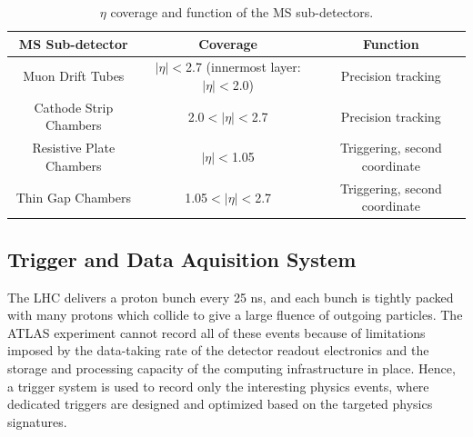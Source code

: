 \begin{table}[!ht]
    \small
    \centering
    \begin{tabular}{ccc}
        \hline \hline
        MS Sub-detector & Coverage & Function \\
        \hline
        Muon Drift Tubes        & $|\eta|<$2.7 (innermost layer: $|\eta|<$2.0) & Precision tracking \\
        Cathode Strip Chambers & 2.0$<|\eta|<$2.7 & Precision tracking \\
        Resistive Plate Chambers & $|\eta|<$1.05 & Triggering, second coordinate \\
        Thin Gap Chambers & 1.05$<|\eta|<$2.7 & Triggering, second coordinate \\
        \hline \hline
    \end{tabular}
    \caption{$\eta$ coverage and function of the MS sub-detectors.}
    \label{tab:ms_systems}
\end{table}

\subsection{Trigger and Data Aquisition System} \label{sub:trig}
The LHC delivers a proton bunch every 25 ns, and each bunch is tightly packed with many protons which collide to give a large fluence of outgoing particles. The ATLAS experiment cannot record all of these events because of limitations imposed by the data-taking rate of the detector readout electronics and the storage and processing capacity of the computing infrastructure in place. Hence, a trigger system is used to record only the interesting physics events, where dedicated triggers are designed and optimized based on the targeted physics signatures.

